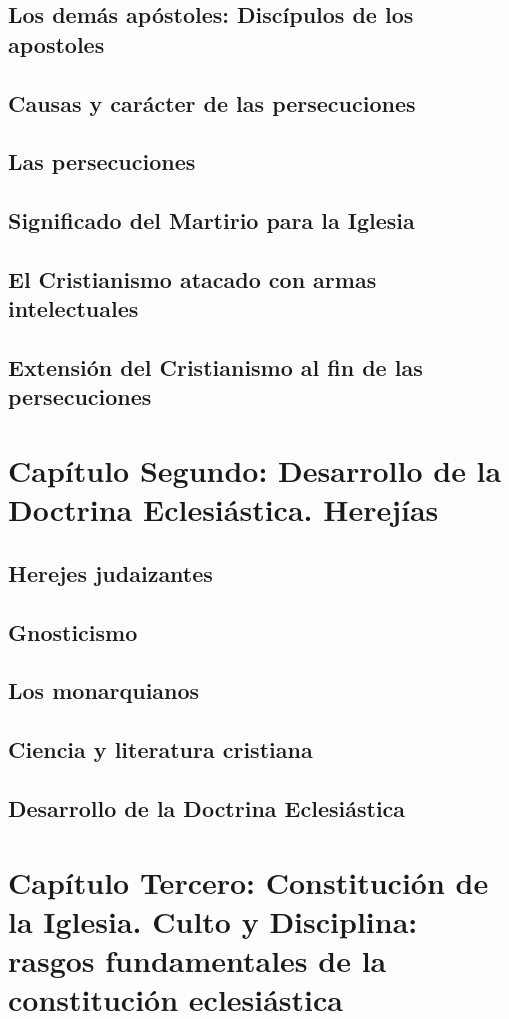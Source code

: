 \raggedbottom{} \documentclass[12pt, a4paper]{book}
\begin{document}
\section{Los demás apóstoles: Discípulos de los apostoles}
\section{Causas y carácter de las persecuciones}
\section{Las persecuciones}
\section{Significado del Martirio para la Iglesia}
\section{El Cristianismo atacado con armas intelectuales}
\section{Extensión del Cristianismo al fin de las persecuciones}
\chapter{Capítulo Segundo: Desarrollo de la Doctrina Eclesiástica. Herejías}
\section{Herejes judaizantes}
\section{Gnosticismo}
\section{Los monarquianos}
\section{Ciencia y literatura cristiana}
\section{Desarrollo de la Doctrina Eclesiástica}
\chapter{Capítulo Tercero: Constitución de la Iglesia. Culto y Disciplina: rasgos fundamentales de la constitución eclesiástica}
\end{document}
